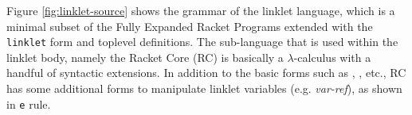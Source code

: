 Figure \ref{fig:linklet-source} shows the grammar of the linklet
language, which is a minimal subset of the Fully Expanded Racket
Programs extended with the \verb|linklet| form and toplevel
definitions. The sub-language that is used within the linklet body,
namely the Racket Core (RC) is basically a $\lambda$-calculus with a handful
of syntactic extensions. In addition to the basic forms such
as , ,  etc., RC has
some additional forms to manipulate linklet variables
(e.g. \emph{var-ref}), as shown in \verb|e| rule. %

